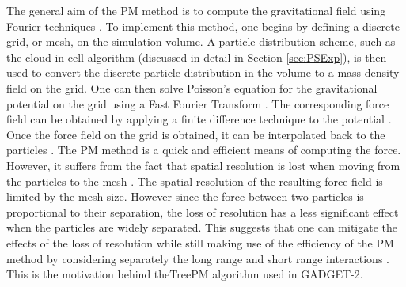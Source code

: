 \documentclass[10pt,letterpaper,final]{iopart}
\numberwithin{equation}{subsection}
\begin{document}
The general aim of the PM method is to compute the gravitational field using Fourier techniques \cite{Schneider}\cite{Gadget1}. To implement this method, one begins by defining a discrete grid, or mesh, on the simulation volume. A particle distribution scheme, such as the cloud-in-cell algorithm \cite{Gadget2}\cite{Donghui} (discussed in detail in Section \ref{sec:PSExp}), is then used to convert the discrete particle distribution in the volume to a mass density field on the grid. One can then solve Poisson's equation for the gravitational potential on the grid using a Fast Fourier Transform \cite{Schneider}\cite{Bernardeau}\cite{Gadget2}. The corresponding force field can be obtained by applying a finite difference technique to the potential \cite{Gadget2}. Once the force field on the grid is obtained, it can be interpolated back to the particles \cite{Bernardeau}\cite{Gadget2}. The PM method is a quick and efficient means of computing the force. However, it suffers from the fact that spatial resolution is lost when moving from the particles to the mesh \cite{Schneider}. The spatial resolution of the resulting force field is limited by the mesh size. However since the force between two particles is proportional to their separation, the loss of resolution has a less significant effect when the particles are widely separated. This suggests that one can mitigate the effects of the loss of resolution while still making use of the efficiency of the PM method by considering separately the long range and short range interactions \cite{Schneider}\cite{Bernardeau}\cite{Gadget1}\cite{Gadget2}. This is the motivation behind theTreePM algorithm used in GADGET-2. 
\end{document}
